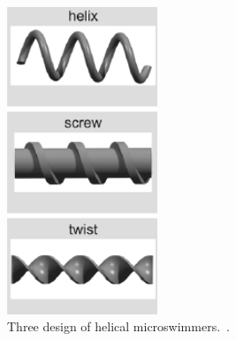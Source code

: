 \documentclass[a4paper,11pt]{article}
\begin{document}
\begin{sloppypar}
\begin{figure}
  \begin{center}
    \includegraphics[width=0.4\textwidth]{HelixShapes}
  \caption{Three design of helical microswimmers.~\citep{peyer2013magnetic}.}
  \label{HelixShapes}
  \end{center}
\end{figure}


\end{sloppypar}
\end{document}
